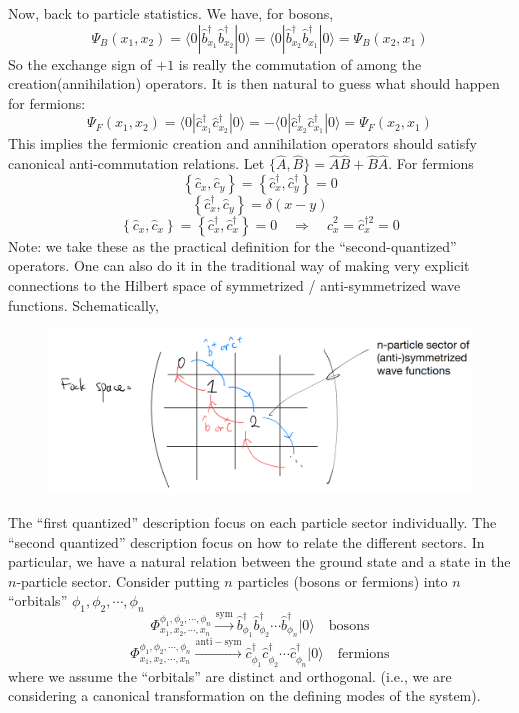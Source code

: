 Now, back to particle statistics. We have, for bosons,
\[ \Psi _B\left( x_1,x_2 \right) =\langle 0|\hat{b}_{x_1}^{\dagger}\hat{b}_{x_2}^{\dagger}|0\rangle =\langle 0|\hat{b}_{x_2}^{\dagger}\hat{b}_{x_1}^{\dagger}|0\rangle =\Psi _B\left( x_2,x_1 \right) \]
So the exchange sign of $+1$ is really the commutation of among the creation(annihilation) operators. It is then natural to guess what should happen for fermions:
\[ \Psi _F\left( x_1,x_2 \right) =\langle 0|\hat{c}_{x_1}^{\dagger}\hat{c}_{x_2}^{\dagger}|0\rangle =-\langle 0|\hat{c}_{x_2}^{\dagger}\hat{c}_{x_1}^{\dagger}|0\rangle =\Psi _F\left( x_2,x_1 \right)  \]
This implies the fermionic creation and annihilation operators should satisfy canonical anti-commutation relations. Let $\{\hat{A},\hat{B}\}=\hat{A}\hat{B}+\hat{B}\hat{A}$. For fermions
\[ \left\{ \hat{c}_x,\hat{c}_y \right\} =\left\{ \hat{c}_{x}^{\dagger},\hat{c}_{y}^{\dagger} \right\} =0 \]
\[ \left\{ \hat{c}_{x}^{\dagger},\hat{c}_y \right\} =\delta \left( x-y \right) \]
\[ \left\{ \hat{c}_x,\hat{c}_x \right\} =\left\{ \hat{c}_{x}^{\dagger},\hat{c}_{x}^{\dagger} \right\} =0\quad \Rightarrow \quad \hat{c}_{x}^{2}=\hat{c}_{x}^{\dagger 2}=0\]
Note: we take these as the practical definition for the ``second-quantized'' operators. One can also do it in the traditional way of making very explicit connections to the Hilbert space of symmetrized / anti-symmetrized wave functions. Schematically,
\begin{figure}[ht]
    \centering
    \includegraphics[width=\textwidth]{jupyterbook/data/fig/lec04-fig00.png}
\end{figure}
The ``first quantized'' description focus on each particle sector individually. The ``second quantized'' description focus on how to relate the different sectors. In particular, we have a natural relation between the ground state and a state in the $n$-particle sector. Consider putting $n$ particles (bosons or fermions) into $n$ ``orbitals'' $\phi_1,\phi_2,\cdots,\phi_n$
\[ \Phi _{x_1,x_2,\cdots ,x_n}^{\phi _1,\phi _2,\cdots ,\phi _n}\xrightarrow{\mathrm{sym}}\hat{b}_{\phi _1}^{\dagger}\hat{b}_{\phi _2}^{\dagger}\cdots \hat{b}_{\phi _n}^{\dagger}|0\rangle \quad \mathrm{bosons}\]
\[ \Phi _{x_1,x_2,\cdots ,x_n}^{\phi _1,\phi _2,\cdots ,\phi _n}\xrightarrow{\mathrm{anti}-\mathrm{sym}}\hat{c}_{\phi _1}^{\dagger}\hat{c}_{\phi _2}^{\dagger}\cdots \hat{c}_{\phi _n}^{\dagger}|0\rangle \quad \mathrm{fermions}\]
where we assume the ``orbitals'' are distinct and orthogonal. (i.e., we are considering a canonical transformation on the defining modes of the system).

